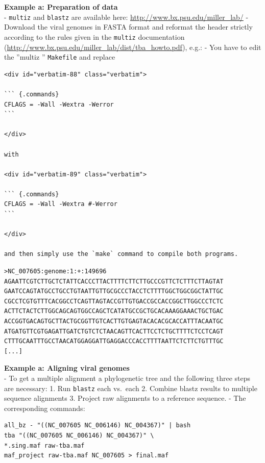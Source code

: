 \documentclass[]{article}
\begin{document}
\textbf{Example a: Preparation of data}\\
- \texttt{multiz} and \texttt{blastz} are available here:
\url{http://www.bx.psu.edu/miller_lab/} - Download the viral genomes in
FASTA format and reformat the header strictly according to the rules
given in the \texttt{multiz} documentation
(\url{http://www.bx.psu.edu/miller_lab/dist/tba_howto.pdf}), e.g.: - You
have to edit the ''multiz '' \texttt{Makefile} and replace

\begin{verbatim}
<div id="verbatim-88" class="verbatim">

``` {.commands}
CFLAGS = -Wall -Wextra -Werror
```

</div>

with

<div id="verbatim-89" class="verbatim">

``` {.commands}
CFLAGS = -Wall -Wextra #-Werror
```

</div>

and then simply use the `make` command to compile both programs.
\end{verbatim}


\begin{verbatim}
>NC_007605:genome:1:+:149696
AGAATTCGTCTTGCTCTATTCACCCTTACTTTTCTTCTTGCCCGTTCTCTTTCTTAGTAT
GAATCCAGTATGCCTGCCTGTAATTGTTGCGCCCTACCTCTTTTGGCTGGCGGCTATTGC
CGCCTCGTGTTTCACGGCCTCAGTTAGTACCGTTGTGACCGCCACCGGCTTGGCCCTCTC
ACTTCTACTCTTGGCAGCAGTGGCCAGCTCATATGCCGCTGCACAAAGGAAACTGCTGAC
ACCGGTGACAGTGCTTACTGCGGTTGTCACTTGTGAGTACACACGCACCATTTACAATGC
ATGATGTTCGTGAGATTGATCTGTCTCTAACAGTTCACTTCCTCTGCTTTTCTCCTCAGT
CTTTGCAATTTGCCTAACATGGAGGATTGAGGACCCACCTTTTAATTCTCTTCTGTTTGC
[...]
\end{verbatim}

\textbf{Example a: Aligning viral genomes}\\
- To get a multiple alignment a phylogenetic tree and the following
three steps are necessary: 1. Run \texttt{blastz} each vs.~each 2.
Combine blastz results to multiple sequence alignments 3. Project raw
alignments to a reference sequence. - The corresponding commands:

\begin{verbatim}
all_bz - "((NC_007605 NC_006146) NC_004367)" | bash
tba "((NC_007605 NC_006146) NC_004367)" \
*.sing.maf raw-tba.maf
maf_project raw-tba.maf NC_007605 > final.maf
\end{verbatim}
\end{document}
